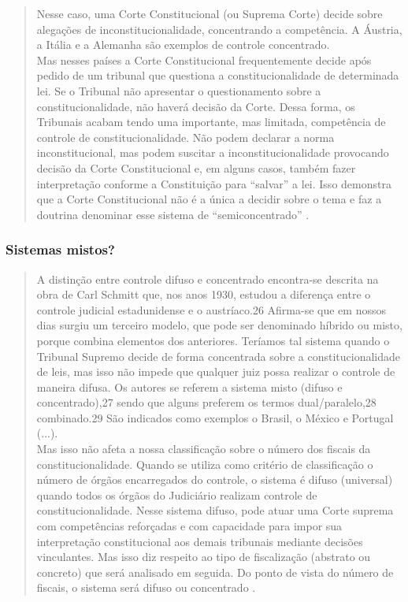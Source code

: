 \documentclass{article}
\begin{document}
\begin{quote}
    Nesse caso, uma Corte Constitucional (ou Suprema Corte) decide sobre alegações de inconstitucionalidade, concentrando a competência. A Áustria, a Itália e a Alemanha são exemplos de controle concentrado.\\
    Mas nesses países a Corte Constitucional frequentemente decide após pedido de um tribunal que questiona a constitucionalidade de determinada lei. Se o Tribunal não apresentar o questionamento sobre a constitucionalidade, não haverá decisão da Corte. Dessa forma, os Tribunais acabam tendo uma importante, mas limitada, competência de controle de constitucionalidade. Não podem declarar a norma inconstitucional, mas podem suscitar a inconstitucionalidade provocando decisão da Corte Constitucional e, em alguns casos, também fazer interpretação conforme a Constituição para “salvar” a lei. Isso demonstra que a Corte Constitucional não é a única a decidir sobre o tema e faz a doutrina denominar esse sistema de “semiconcentrado” \cite[p. 79]{dimoulis_curso_2016}.
\end{quote}

\subsubsection{Sistemas mistos?}

\begin{quote}
    A distinção entre controle difuso e concentrado encontra-se descrita na obra de Carl Schmitt que, nos anos 1930, estudou a diferença entre o controle judicial estadunidense e o austríaco.26 Afirma-se que em nossos dias surgiu um terceiro modelo, que pode ser denominado híbrido ou misto, porque combina elementos dos anteriores. Teríamos tal sistema quando o Tribunal Supremo decide de forma concentrada sobre a constitucionalidade de leis, mas isso não impede que qualquer juiz possa realizar o controle de maneira difusa. Os autores se referem a sistema misto (difuso e concentrado),27 sendo que alguns preferem os termos dual/paralelo,28 combinado.29 São indicados como exemplos o Brasil, o México e Portugal (...).\\
    Mas isso não afeta a nossa classificação sobre o número dos fiscais da constitucionalidade. Quando se utiliza como critério de classificação o número de órgãos encarregados do controle, o sistema é difuso (universal) quando todos os órgãos do Judiciário realizam controle de constitucionalidade. Nesse sistema difuso, pode atuar uma Corte suprema com competências reforçadas e com capacidade para impor sua interpretação constitucional aos demais tribunais mediante decisões vinculantes. Mas isso diz respeito ao tipo de fiscalização (abstrato ou concreto) que será analisado em seguida. Do ponto de vista do número de fiscais, o sistema será difuso ou concentrado \cite[pp. 79-81]{dimoulis_curso_2016}.
\end{quote}
\end{document}

